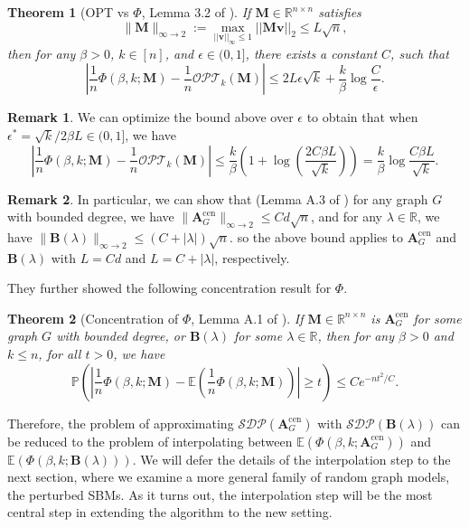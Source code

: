 \documentclass[11pt, titlepage]{article} %
\numberwithin{equation}{section}
\newtheorem{theorem}{Theorem}
\theoremstyle{definition}
\newtheorem{remark}{Remark}
\numberwithin{theorem}{section}
\numberwithin{lemma}{section}
\numberwithin{corollary}{section}
\numberwithin{proposition}{section}
\numberwithin{definition}{section}
\numberwithin{remark}{section}
\begin{document}
\begin{theorem}[OPT vs $\Phi$, Lemma 3.2 of \cite{MS16}]
\label{thm:OPT.Phi}
If $\bm{M} \in \mathbb{R}^{n \times n}$ satisfies
\[
\|\bm{M}\|_{\infty \to 2} := \max_{||\bm{v}||_\infty \leq 1} ||\bm{M}\bm{v}||_2 \leq L\sqrt{n},
\]
then for any $\beta > 0$, $k \in [n]$, and $\epsilon \in (0,1]$, there exists a constant $C$, such that
\[
\left|\frac{1}{n}\Phi(\beta, k; \bm{M}) - \frac{1}{n}\mathcal{OPT}_k(\bm{M})\right| 
\leq 2L\epsilon \sqrt{k} + \frac{k}{\beta}\log\frac{C}{\epsilon}.
\]
\end{theorem}
\begin{remark}
We can optimize the bound above over $\epsilon$ to obtain that when $\epsilon^*= \sqrt{k}/2\beta L
\in (0,1]$, we have
\[
\left|\frac{1}{n}\Phi(\beta, k; \bm{M}) - \frac{1}{n}\mathcal{OPT}_k(\bm{M})\right| 
\leq \frac{k}{\beta} \left(1 + \log\left(\frac{2C\beta L}{\sqrt{k}}\right)\right)
= \frac{k}{\beta} \log \frac{C\beta L}{\sqrt{k}}.
\]
\end{remark}
\begin{remark}
In particular, we can show that (Lemma A.3 of \cite{MS16}) for any graph $G$ with bounded degree, we have 
$\|\bm{A}^\mathrm{cen}_{G}\|_{\infty \to 2} \leq Cd\sqrt{n}$, and for any $\lambda \in \mathbb{R}$, 
we have $\|\bm{B}(\lambda)\|_{\infty \to 2} \leq (C + |\lambda|)\sqrt{n}$. so the above bound 
applies to $\bm{A}^\mathrm{cen}_{G}$ and $\bm{B}(\lambda)$ with $L = Cd$ and $L = C + |\lambda|$, respectively.
\end{remark}

They further showed the following concentration result for $\Phi$.
\begin{theorem}[Concentration of $\Phi$, Lemma A.1 of \cite{MS16}]
\label{thm:Phi.conc}
If $\bm{M} \in \mathbb{R}^{n \times n}$ is $\bm{A}^\mathrm{cen}_{G}$ for some graph $G$ with bounded degree,
or $\bm{B}(\lambda)$ for some $\lambda \in \mathbb{R}$, then for any $\beta > 0$ and $k \leq n$, 
for all $t>0$, we have
\[
\mathbb{P}\left(\left|\frac{1}{n}\Phi(\beta, k; \bm{M})
- \mathbb{E}\left(\frac{1}{n}\Phi(\beta, k; \bm{M})\right)\right| \geq t\right) \leq Ce^{-nt^2/C}.
\]
\end{theorem}

Therefore, the problem of approximating $\mathcal{SDP}(\bm{A}^\mathrm{cen}_{G})$ with
$\mathcal{SDP}(\bm{B}(\lambda))$ can be reduced to the problem of interpolating between
$\mathbb{E}(\Phi(\beta, k; \bm{A}^\mathrm{cen}_{G}))$ and $\mathbb{E}(\Phi(\beta, k; \bm{B}(\lambda)))$.
We will defer the details of the interpolation step to the next section, where we examine a more general
family of random graph models, the perturbed SBMs. As it turns out, the interpolation step will be the
most central step in extending the algorithm to the new setting.
\end{document}
